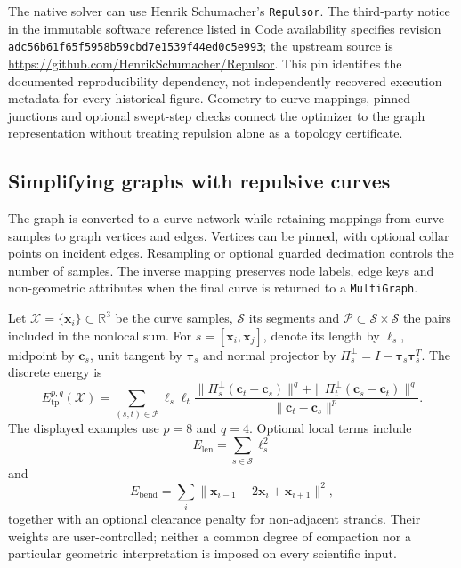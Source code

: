 \documentclass[10pt,twocolumn]{article}
\begin{document}
The native solver can use Henrik Schumacher's \texttt{Repulsor}. The third-party notice in the immutable software reference listed in Code availability specifies revision \texttt{adc56b61f65f5958b59cbd7e1539f44ed0c5e993}; the upstream source is \url{https://github.com/HenrikSchumacher/Repulsor}. This pin identifies the documented reproducibility dependency, not independently recovered execution metadata for every historical figure. Geometry-to-curve mappings, pinned junctions and optional swept-step checks connect the optimizer to the graph representation without treating repulsion alone as a topology certificate.

\subsection{Simplifying graphs with repulsive curves}
\label{supp:repulsive_objective}
The graph is converted to a curve network while retaining mappings from curve samples to graph vertices and edges. Vertices can be pinned, with optional collar points on incident edges. Resampling or optional guarded decimation controls the number of samples. The inverse mapping preserves node labels, edge keys and non-geometric attributes when the final curve is returned to a \texttt{MultiGraph}.

Let $\mathcal X=\{\mathbf x_i\}\subset\mathbb R^3$ be the curve samples, $\mathcal S$ its segments and $\mathcal P\subset\mathcal S\times\mathcal S$ the pairs included in the nonlocal sum. For $s=[\mathbf x_i,\mathbf x_j]$, denote its length by $\ell_s$, midpoint by $\mathbf c_s$, unit tangent by $\boldsymbol\tau_s$ and normal projector by $\Pi_s^\perp=I-\boldsymbol\tau_s\boldsymbol\tau_s^T$. The discrete energy is
\begin{equation}
E_{\mathrm{tp}}^{p,q}(\mathcal X)=\sum_{(s,t)\in\mathcal P}\ell_s\ell_t\frac{\|\Pi_s^\perp(\mathbf c_t-\mathbf c_s)\|^q+\|\Pi_t^\perp(\mathbf c_s-\mathbf c_t)\|^q}{\|\mathbf c_t-\mathbf c_s\|^p}.
\label{suppeq:tangent_point_energy}
\end{equation}
The displayed examples use $p=8$ and $q=4$. Optional local terms include
\begin{equation}
E_{\mathrm{len}}=\sum_{s\in\mathcal S}\ell_s^2
\end{equation}
and
\begin{equation}
E_{\mathrm{bend}}=\sum_i\|\mathbf x_{i-1}-2\mathbf x_i+\mathbf x_{i+1}\|^2,
\end{equation}
together with an optional clearance penalty for non-adjacent strands. Their weights are user-controlled; neither a common degree of compaction nor a particular geometric interpretation is imposed on every scientific input.
\end{document}
